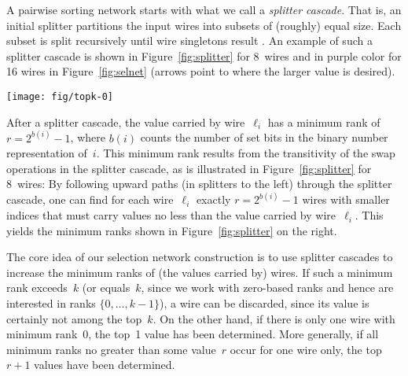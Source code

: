 \documentclass{article}
\begin{document}
A pairwise sorting network starts with what we
call a {\em splitter cascade}. That is, an initial splitter
partitions the input wires into subsets of (roughly) equal size.
Each subset is split recursively until wire singletons result
\citep{Zazon-Ivry_and_Codish_2012}. An example of such a splitter cascade is
shown in Figure~\ref{fig:splitter} for 8~wires and in purple color for
16 wires in Figure~\ref{fig:selnet}
(arrows point to where the larger value is desired).


\begin{figure*}[t]
\centering
\texttt{[image: fig/topk-0]}
\caption{\label{fig:selnet}A $(5,16)$ selection network constructed
  with the method described in the text. The numbers on the wires are
  the minimum ranks (starting at 0) that can be occupied by the values
  on these wires. Red crosses mark where wires can be excluded, green
  check marks where a top rank is determined. Swaps in blocks of equal
  color belong to the same splitter cascade. Swaps in gray boxes would
  be needed for full splitter cascades, but are not needed to determine
  the top 5 ranks.}
\end{figure*}


After a splitter cascade, the value carried by wire~$\ell_i$ has a
minimum rank of $r = 2^{b(i)}{-}1$, where $b(i)$ counts the number of
set bits in the binary number representation of~$i$. This minimum rank
results from the transitivity of the swap operations in the splitter
cascade, as is illustrated in Figure~\ref{fig:splitter} for 8~wires:
By following upward paths (in splitters to the left) through the
splitter cascade, one can find for each wire~$\ell_i$ exactly
$r = 2^{b(i)}{-}1$ wires with smaller indices that must carry values
no less than the value carried by wire~$\ell_i$. This yields the
minimum ranks shown in Figure~\ref{fig:splitter} on the right.



The core idea of our selection network construction is to use splitter
cascades to increase the minimum ranks of (the values carried by) wires.
If such a minimum rank exceeds~$k$ (or equals~$k$, since we work with
zero-based ranks and hence are interested in ranks
$\{0,\ldots,k{-}1\}$), a wire can be discarded, since its value is
certainly not among the top~$k$. On the other hand, if there is only
one wire with minimum rank~0, the top~1 value has been determined.
More generally, if all minimum ranks no greater than some value~$r$
occur for one wire only, the top~$r+1$ values have been determined.
\end{document}
